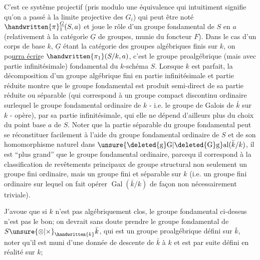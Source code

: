 C'est ce systême projectif (pris modulo une équivalence qui intuitiment signifie qu'on a passé à la limite projective des $G_i$) qui peut être noté $\handwritten{\pi}^{\underline{G}}_1(S,a)$ et joue le rôle d'un groupe fondamental de $S$ en $a$ (relativement à la catégorìe $\underline{G}$ de groupes, munie du foncteur $F$). Dans le cas  d'un corps de base $k$, $\underline{G}$ étant la catégorie des groupes algébriques finis sur $k$, on po\uline{urra écrir}e $\handwritten{\pi_1}(S/k,a)$, c'est le groupe proalgébrique (mais avec partie infinitésimale) fondamental du $k$-schéma $S$. Lorsque $k$ est parfait, la décomposition d'un groupe algébrique fini en partie infinitésimale et partie réduite montre que le groupe fondamental est produit semi-direct de sa partie réduite ou séparable  (qui correspond à un groupe compact discontinu ordinaire\handwritten{,} surlequel le groupe fondamental ordinaire de $k$ - i.e. le groupe de Galois de $\bar{k}$ sur $k$ - opère), par sa partie infinitésimale,  qui elle ne dépend d'ailleurs plus du choix du point base $a$ de $S$. Noter que la partie séparable du groupe fondamental peut se réconstituer facilement à l'aide du groupe fondamental ordinaire de $S$ et de son homomorphisme naturel dans $\unsure{\deleted{\mathrm{g}}\mathrm{G}|\deleted{\mathrm{G}}\mathrm{g}}\mathrm{al}(\bar{k}/k)$,  il est ``plus grand'' que le groupe fondamental ordinaire, parce\inserted{\handwritten{\,}}qu il correspond à la classification de revêtements principaux de groupe structural non seulement un groupe fini ordinaire, mais un groupe  fini et séparable sur $k$ (i.e. un groupe fini ordinaire sur lequel on fait opérer $\operatorname{Gal}(\bar{k}/k)$ de façon non nécessairement triviale). 

J'avoue que si $k$ n'est pas algébriquement clos, le groupe fondamental ci-dessus n'est   pas le bon; on devrait sans doute prendre le groupe fondamental de $S\unsure{\otimes|\times}_{\handwritten{k}}\bar{k}$, qui est un groupe proalgébrique défini sur $\bar{k}$, noter qu'il est muni d'une donnée de descente de $\bar{k}$ à $k$ et est par suite défini en réalité sur $k$; 

